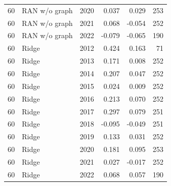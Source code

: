 \begin{table}[htbp]
{\begin{tabular}{llrrrr}
60 & RAN w/o graph & 2020 & 0.037 & 0.029 & 253 \\
60 & RAN w/o graph & 2021 & 0.068 & -0.054 & 252 \\
60 & RAN w/o graph & 2022 & -0.079 & -0.065 & 190 \\
60 & Ridge & 2012 & 0.424 & 0.163 & 71 \\
60 & Ridge & 2013 & 0.171 & 0.008 & 252 \\
60 & Ridge & 2014 & 0.207 & 0.047 & 252 \\
60 & Ridge & 2015 & 0.024 & 0.009 & 252 \\
60 & Ridge & 2016 & 0.213 & 0.070 & 252 \\
60 & Ridge & 2017 & 0.297 & 0.079 & 251 \\
60 & Ridge & 2018 & -0.095 & -0.049 & 251 \\
60 & Ridge & 2019 & 0.133 & 0.031 & 252 \\
60 & Ridge & 2020 & 0.181 & 0.095 & 253 \\
60 & Ridge & 2021 & 0.027 & -0.017 & 252 \\
60 & Ridge & 2022 & 0.068 & 0.057 & 190 \\
\bottomrule
\end{tabular}}
\end{table}